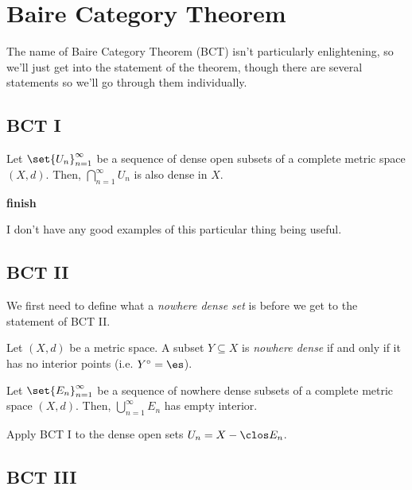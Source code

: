 \documentclass[class=article, crop=false]{standalone}
\begin{document}
\section{Baire Category Theorem}

The name of Baire Category Theorem (BCT) isn't particularly enlightening, so we'll just get into the statement of the theorem, though there are several statements so we'll go through them individually.

\subsection{BCT I}

\begin{thm}[BCT I]
    Let $\set{U_n}_{n=1}^\infty$ be a sequence of dense open subsets of a complete metric space $(X,d)$. Then, $\bigcap_{n=1}^{\infty} U_n$ is also dense in $X$.
\end{thm}
\begin{pf}
    \textbf{finish}
\end{pf}

I don't have any good examples of this particular thing being useful.

\subsection{BCT II}

We first need to define what a \textit{nowhere dense set} is before we get to the statement of BCT II.

\begin{defn}
    Let $(X,d)$ be a metric space. A subset $Y \subseteq X$ is \textit{nowhere dense} if and only if it has no interior points (i.e. $Y^\circ = \es$).
\end{defn}

\begin{thm}[BCT II]
    Let $\set{E_n}_{n=1}^\infty$ be a sequence of nowhere dense subsets of a complete metric space $(X,d)$. Then, $\bigcup_{n=1}^{\infty} E_n$ has empty interior.
\end{thm}
\begin{pf}
    Apply BCT I to the dense open sets $U_n = X - \clos E_n$.
\end{pf}


\subsection{BCT III}
\end{document}
